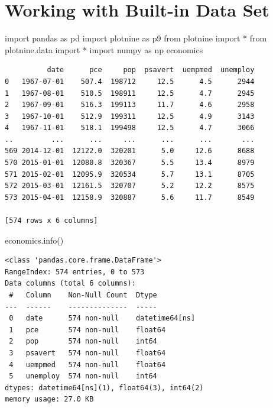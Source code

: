 \documentclass[
  11pt,
  a4paper,
]{report}
\newenvironment{Shaded}{\begin{snugshade}}{\end{snugshade}}
\newcommand{\ImportTok}[1]{\textcolor[rgb]{0.00,0.46,0.62}{#1}}
\newcommand{\NormalTok}[1]{\textcolor[rgb]{0.00,0.23,0.31}{#1}}
\newcommand{\OperatorTok}[1]{\textcolor[rgb]{0.37,0.37,0.37}{#1}}
\begin{document}
\section{Working with Built-in Data
Set}\label{working-with-built-in-data-set}

\begin{Shaded}
\begin{Highlighting}[]
\ImportTok{import}\NormalTok{ pandas }\ImportTok{as}\NormalTok{ pd}
\ImportTok{import}\NormalTok{ plotnine }\ImportTok{as}\NormalTok{ p9 }
\ImportTok{from}\NormalTok{ plotnine }\ImportTok{import} \OperatorTok{*}
\ImportTok{from}\NormalTok{ plotnine.data }\ImportTok{import} \OperatorTok{*}
\ImportTok{import}\NormalTok{ numpy }\ImportTok{as}\NormalTok{ np}
\NormalTok{economics}
\end{Highlighting}
\end{Shaded}

\begin{verbatim}
          date      pce     pop  psavert  uempmed  unemploy
0   1967-07-01    507.4  198712     12.5      4.5      2944
1   1967-08-01    510.5  198911     12.5      4.7      2945
2   1967-09-01    516.3  199113     11.7      4.6      2958
3   1967-10-01    512.9  199311     12.5      4.9      3143
4   1967-11-01    518.1  199498     12.5      4.7      3066
..         ...      ...     ...      ...      ...       ...
569 2014-12-01  12122.0  320201      5.0     12.6      8688
570 2015-01-01  12080.8  320367      5.5     13.4      8979
571 2015-02-01  12095.9  320534      5.7     13.1      8705
572 2015-03-01  12161.5  320707      5.2     12.2      8575
573 2015-04-01  12158.9  320887      5.6     11.7      8549

[574 rows x 6 columns]
\end{verbatim}

\begin{Shaded}
\begin{Highlighting}[]
\NormalTok{economics.info()}
\end{Highlighting}
\end{Shaded}

\begin{verbatim}
<class 'pandas.core.frame.DataFrame'>
RangeIndex: 574 entries, 0 to 573
Data columns (total 6 columns):
 #   Column    Non-Null Count  Dtype         
---  ------    --------------  -----         
 0   date      574 non-null    datetime64[ns]
 1   pce       574 non-null    float64       
 2   pop       574 non-null    int64         
 3   psavert   574 non-null    float64       
 4   uempmed   574 non-null    float64       
 5   unemploy  574 non-null    int64         
dtypes: datetime64[ns](1), float64(3), int64(2)
memory usage: 27.0 KB
\end{verbatim}
\end{document}
